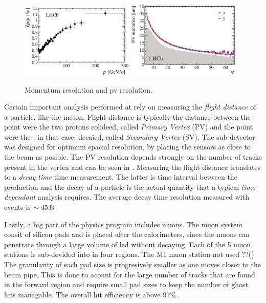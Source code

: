 \begin{figure}[t]
  \centering
  \includegraphics[width=0.48\textwidth]{Figures/Chapter2/dppVsp-crop-cmyk}
  \includegraphics[width=0.48\textwidth]{Figures/Chapter2/DataResXY_1PV_2012-crop-cmyk.pdf}
  \caption{\lhcb Momentum resolution and pv resolution.}
  \label{det_deltappvp}
\end{figure}

Certain important analysis performed at \lhcb rely on measuring the {\it flight distance} of a particle, like the \Bs meson.
Flight distance is typically the distance between the point were the two protons colideed, called {\it Primary Vertex} (PV)
and the point were the \Bs, in that case, decaied, called {\it Secondary Vertex} (SV). The \velo sub-detector was designed
for optimum spacial resolution, by placing the \velo sensors as close to the beam as posible. The PV resolution depends
strongly on the number of tracks present in the vertex and can be seen in \figref{}. Measuring the flight distance translates
to a {\it decay time} time measurement. The latter is time interval between the production and the decay of a particle is the
actual quantity that a typical {\it time dependant} analysis requires. The average decay time resolution measured with \BsJpsiPhi
events is $\sim 45\rm \,fs$

Lastly, a big part of the \lhcb physics program includes muons. The muon system consit of silicon pads and is placed after
the calorimeters, since the muons can penetrate through a large volume of led without decaying.
Each of the 5 muon stations is sub-devided into in four regions. {\color{red} The M1 muon station not used ??()}
The granularity of each pad size is progresively smaller as one moves closer to the beam pipe. This is done to acount
for the large number of tracks that are found in the forward region and require small pad sizes to keep the number
of ghost hits managable. The overall hit efficiency is above $97\%$.
